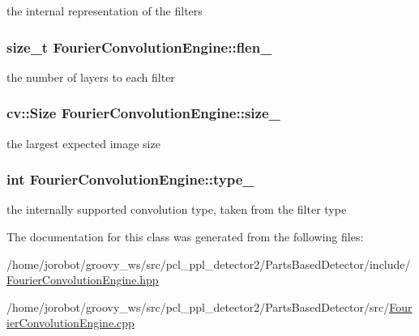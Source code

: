 the internal representation of the filters 

\hypertarget{classFourierConvolutionEngine_ab4322f51ce4a18ab5b7439abb5c96aef}{
\subsubsection[{flen\-\_\-}]{\setlength{\rightskip}{0pt plus 5cm}size\-\_\-t {\bf \-Fourier\-Convolution\-Engine\-::flen\-\_\-}}}\label{classFourierConvolutionEngine_ab4322f51ce4a18ab5b7439abb5c96aef}


the number of layers to each filter 

\hypertarget{classFourierConvolutionEngine_a2375ea1729ad2fe45fe6204130f3f39f}{
\subsubsection[{size\-\_\-}]{\setlength{\rightskip}{0pt plus 5cm}cv\-::\-Size {\bf \-Fourier\-Convolution\-Engine\-::size\-\_\-}}}\label{classFourierConvolutionEngine_a2375ea1729ad2fe45fe6204130f3f39f}


the largest expected image size 

\hypertarget{classFourierConvolutionEngine_a3e213d98d690b295eaa2866618f17933}{
\subsubsection[{type\-\_\-}]{\setlength{\rightskip}{0pt plus 5cm}int {\bf \-Fourier\-Convolution\-Engine\-::type\-\_\-}}}\label{classFourierConvolutionEngine_a3e213d98d690b295eaa2866618f17933}


the internally supported convolution type, taken from the filter type 



\-The documentation for this class was generated from the following files\-:\begin{DoxyCompactItemize}
\item 
/home/jorobot/groovy\-\_\-ws/src/pcl\-\_\-ppl\-\_\-detector2/\-Parts\-Based\-Detector/include/\hyperlink{FourierConvolutionEngine_8hpp}{\-Fourier\-Convolution\-Engine.\-hpp}\item 
/home/jorobot/groovy\-\_\-ws/src/pcl\-\_\-ppl\-\_\-detector2/\-Parts\-Based\-Detector/src/\hyperlink{FourierConvolutionEngine_8cpp}{\-Fourier\-Convolution\-Engine.\-cpp}\end{DoxyCompactItemize}
